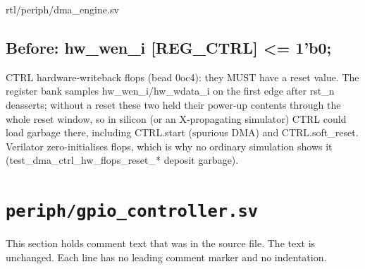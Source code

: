 \begin{relocated}{rtl/periph/dma_engine.sv}
\subsection*{Before: hw\_wen\_i  [REG\_CTRL]   <= 1'b0;}

\begin{textblock}
CTRL hardware-writeback flops (bead 0oc4): they MUST have a reset value. The register
bank samples hw_wen_i/hw_wdata_i on the first edge after rst_n deasserts; without a
reset these two held their power-up contents through the whole reset window, so in
silicon (or an X-propagating simulator) CTRL could load garbage there, including
CTRL.start (spurious DMA) and CTRL.soft_reset. Verilator zero-initialises flops, which
is why no ordinary simulation shows it (test_dma_ctrl_hw_flops_reset_* deposit garbage).
\end{textblock}

\end{relocated}

\section{\texttt{periph/gpio\_controller.sv}}\label{tm:mod:gpio-controller}

This section holds comment text that was in the source file. The text is unchanged. Each line has no leading comment marker and no indentation.


